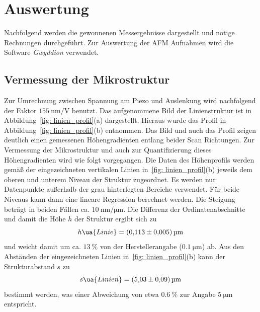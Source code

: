 \section{Auswertung}
Nachfolgend werden die gewonnenen Messergebnisse dargestellt und nötige Rechnungen durchgeführt.
Zur Auswertung der AFM Aufnahmen wird die Software \textit{Gwyddion} verwendet.

\FloatBarrier
\subsection{Vermessung der Mikrostruktur}

Zur Umrechnung zwischen Spannung am Piezo und Auslenkung wird nachfolgend der Faktor
$\SI{155}{\nano\meter \per \volt}$ benutzt.
Das aufgenommene Bild der Linienstruktur ist in Abbildung~\ref{fig: linien_profil}(a) dargestellt. Hieraus wurde
das Profil in Abbildung~\ref{fig: linien_profil}(b) entnommen. Das Bild und auch das Profil zeigen deutlich einen gemessenen
Höhengradienten entlang beider Scan Richtungen. Zur Vermessung der Mikrostruktur und auch zur Quantifizierung
dieses Höhengradienten wird wie folgt vorgegangen. Die Daten des Höhenprofils werden gemäß der
eingezeichneten vertikalen Linien in~\ref{fig: linien_profil}(b) jeweils dem oberen und unterem
Niveau der Struktur zugeordnet. Es werden nur Datenpunkte außerhalb der grau hinterlegten Bereiche verwendet.
Für beide Niveaus kann dann eine lineare Regression berechnet werden.
Die Steigung beträgt in beiden Fällen ca. $\SI{10}{\nano\meter\per\micro\meter}$. Die Differenz
der Ordinatenabschnitte und damit die Höhe $h$ der Struktur ergibt sich zu
\begin{equation}
  h\ua{Linie} = \SI{0.113(5)}{\micro\meter}
\end{equation}
und weicht damit um ca. $\SI{13}{\percent}$ von der Herstellerangabe ($\SI{0.1}{\micro\meter}$) ab. Aus den Abständen der eingezeichneten
Linien in~\ref{fig: linien_profil}(b) kann der Strukturabstand $s$ zu
\begin{equation}
  s\ua{Linien} = \SI{5.03(9)}{\micro\meter}
\end{equation}
bestimmt werden, was einer Abweichung von etwa $\SI{0.6}{\percent}$ zur Angabe $\SI{5}{\micro\meter}$ entspricht.
